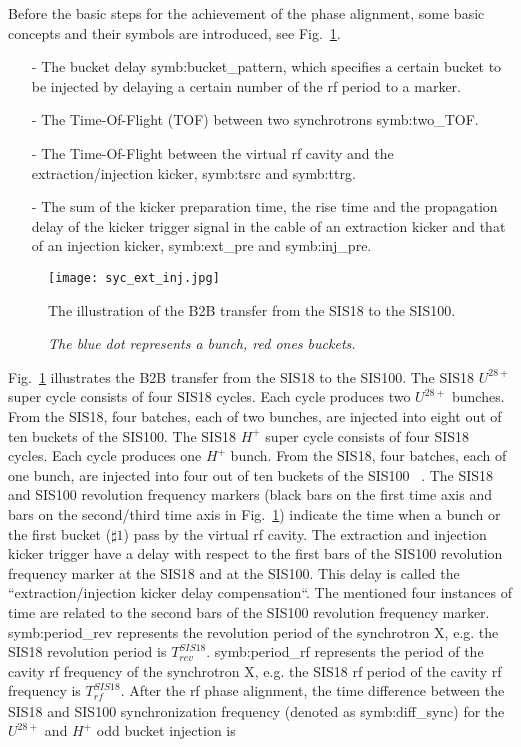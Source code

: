 
Before the basic steps for the achievement of the phase alignment, some basic concepts and their symbols are introduced, see Fig.~\ref{ext_inj_kicker}.

\begin{itemize}
\item[-] The bucket delay \gls{symb:bucket_pattern}, which specifies a certain bucket to be injected by delaying a certain number of the rf period to a marker.
\item[-] The Time-Of-Flight (\gls{TOF}) between two synchrotrons \gls{symb:two_TOF}. 
\item[-] The Time-Of-Flight between the virtual rf cavity and the extraction/injection kicker, \gls{symb:tsrc} and \gls{symb:ttrg}. 
\item[-] The sum of the kicker preparation time, the rise time and the propagation delay of the kicker trigger signal in the cable of an extraction kicker and that of an injection kicker, \gls{symb:ext_pre} and \gls{symb:inj_pre}.
\end{itemize}
\begin{figure}[!htb]
   \centering   
   \texttt{[image: syc\_ext\_inj.jpg]}
   \caption{The illustration of the B2B transfer from the SIS18 to the SIS100.}
	\caption*{\textsl{\small{The blue dot represents a bunch, red ones buckets.}}}
   \label{ext_inj_kicker}
\end{figure}
Fig.~\ref{ext_inj_kicker} illustrates the B2B transfer from the SIS18 to the SIS100. The SIS18 $U^{28+}$ super cycle consists of four SIS18 cycles. Each cycle produces two $U^{28+}$ bunches. From the SIS18, four batches, each of two bunches, are injected into eight out of ten buckets of the SIS100. The SIS18 $H^{+}$ super cycle consists of four SIS18 cycles. Each cycle produces one $H^{+}$ bunch. From the SIS18, four batches, each of one bunch, are injected into four out of ten buckets of the SIS100 ~\cite{liebermann_fair_2013, liebermann_sis100_2013}. The SIS18 and SIS100 revolution frequency markers (black bars on the first time axis and bars on the second/third time axis in Fig.~\ref{ext_inj_kicker}) indicate the time when a bunch or the first bucket ($\sharp1$) pass by the virtual rf cavity. The extraction and injection kicker trigger have a delay with respect to the first bars of the SIS100 revolution frequency marker at the SIS18 and at the SIS100. This delay is called the ``extraction/injection kicker delay compensation``. The mentioned four instances of time are related to the second bars of the SIS100 revolution frequency marker. \gls{symb:period_rev} represents the revolution period of the synchrotron X, e.g. the SIS18 revolution period is $T_{\mathit{rev}}^{\mathit{SIS18}}$. \gls{symb:period_rf} represents the period of the cavity rf frequency of the synchrotron X, e.g. the SIS18 rf period of the cavity rf frequency is $T_{\mathit{rf}}^{\mathit{SIS18}}$. After the rf phase alignment, the time difference between the SIS18 and SIS100 synchronization frequency (denoted as \gls{symb:diff_sync}) for the $U^{28+}$ and $H^{+}$ odd bucket injection is
